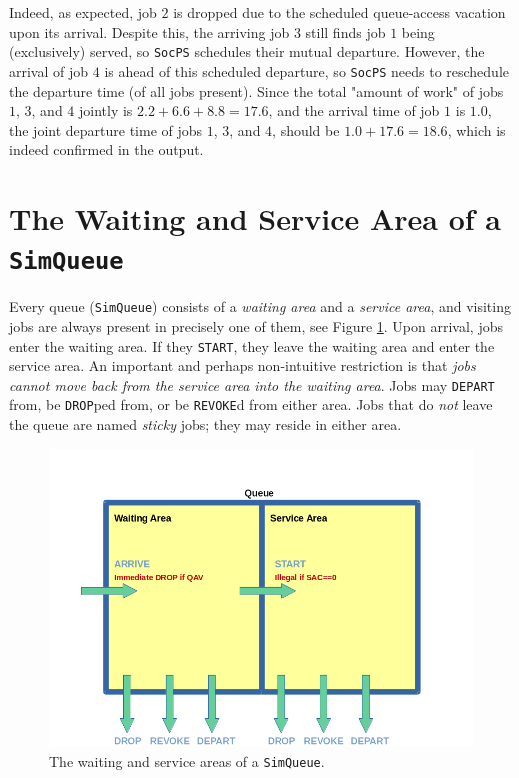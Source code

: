 Indeed, as expected, job $2$ is dropped due to the scheduled queue-access vacation
  upon its arrival.
Despite this,
  the arriving job $3$ still finds job $1$ being (exclusively) served,
  so \lstinline|SocPS| schedules their mutual departure.
However,
  the arrival of job $4$ is ahead of this scheduled departure,
  so \lstinline|SocPS| needs to reschedule the departure time
  (of all jobs present).
Since the total "amount of work"
  of jobs $1$, $3$, and $4$ jointly is $2.2 + 6.6 + 8.8 = 17.6$,
  and the arrival time of job $1$ is $1.0$,
  the joint departure time of jobs $1$, $3$, and $4$,
  should be $1.0+17.6=18.6$,
  which is indeed confirmed in the output.

\section{The Waiting and Service Area of a \texttt{SimQueue}}
\label{sec:guided:wait-serv-area}

Every queue (\lstinline|SimQueue|) consists of
  a {\em waiting area\/} and a {\em service area},
  and visiting jobs are always present in precisely
  one of them,
  see Figure \ref{fig:WaitingAndServiceArea}.
Upon arrival, jobs enter the waiting area.
If they \lstinline|START|,
  they leave the waiting area and
  enter the service area.
An important and perhaps non-intuitive restriction
  is that {\em jobs cannot move back from the service area
  into the waiting area}.
Jobs may \lstinline|DEPART| from,
  be \lstinline|DROP|ped from,
  or be \lstinline|REVOKE|d from
  either area.
Jobs that do {\em not\/} leave the queue
  are named {\em sticky\/} jobs;
  they may reside in either area.

\begin{figure}[h]
\label{fig:WaitingAndServiceArea}
\caption{The waiting and service areas of a \texttt{SimQueue}.}
\includegraphics[width=\textwidth]{fig/WaitingAndServiceArea}
\end{figure}

